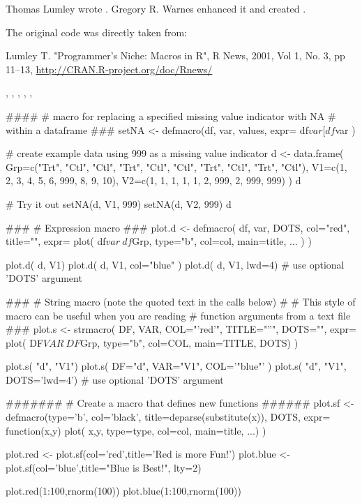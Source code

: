 \begin{Author}\relax
Thomas Lumley wrote .  Gregory R. Warnes
 enhanced it and created
.
\end{Author}
\begin{References}\relax
The original  code was directly taken from:

Lumley T. "Programmer's Niche: Macros in {R}", R News, 2001, Vol 1,
No. 3, pp 11--13, \url{http://CRAN.R-project.org/doc/Rnews/}
\end{References}
\begin{SeeAlso}\relax
{}
,
,
,
,
,
\end{SeeAlso}
\begin{Examples}
\begin{ExampleCode}
####
# macro for replacing a specified missing value indicator with NA
# within a dataframe
###
setNA <- defmacro(df, var, values,
                  expr={
                         df$var[df$var %
                       })

# create example data using 999 as a missing value indicator
d <- data.frame(
   Grp=c("Trt", "Ctl", "Ctl", "Trt", "Ctl", "Ctl", "Trt", "Ctl", "Trt", "Ctl"),
   V1=c(1, 2, 3, 4, 5, 6, 999, 8,   9,  10),
   V2=c(1, 1, 1, 1, 1, 2, 999, 2, 999, 999)
               )
d

# Try it out
setNA(d, V1, 999)
setNA(d, V2, 999)
d

###
# Expression macro
###
plot.d <- defmacro( df, var, DOTS, col="red", title="", expr=
  plot( df$var ~ df$Grp, type="b", col=col, main=title, ... )
)

plot.d( d, V1)
plot.d( d, V1, col="blue" )
plot.d( d, V1, lwd=4)  # use optional 'DOTS' argument

###
# String macro (note the quoted text in the calls below)
# 
# This style of macro can be useful when you are reading
# function arguments from a text file
###
plot.s <- strmacro( DF, VAR, COL="'red'", TITLE="''", DOTS="", expr=
  plot( DF$VAR ~ DF$Grp, type="b", col=COL, main=TITLE, DOTS)
)

plot.s( "d", "V1")
plot.s( DF="d", VAR="V1", COL='"blue"' ) 
plot.s( "d", "V1", DOTS='lwd=4')  # use optional 'DOTS' argument


#######
# Create a macro that defines new functions
######
plot.sf <- defmacro(type='b', col='black',
                    title=deparse(substitute(x)), DOTS, expr=
  function(x,y) plot( x,y, type=type, col=col, main=title, ...)
)

plot.red  <- plot.sf(col='red',title='Red is more Fun!')
plot.blue <- plot.sf(col='blue',title="Blue is Best!", lty=2)

plot.red(1:100,rnorm(100))
plot.blue(1:100,rnorm(100))

\end{ExampleCode}
\end{Examples}

